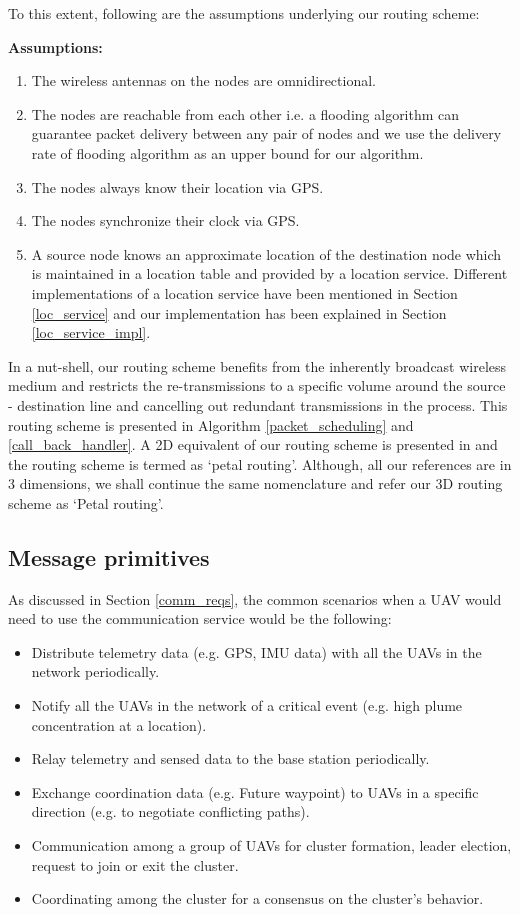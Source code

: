 To this extent, following are the assumptions underlying our routing scheme:

\textbf{Assumptions:}
\begin{enumerate}
\item The wireless antennas on the nodes are omnidirectional.
\item The nodes are reachable from each other i.e. a flooding algorithm can guarantee packet delivery between any pair of nodes and we use the delivery rate of flooding algorithm as an upper bound for our algorithm.
\item The nodes always know their location via GPS. 
\item The nodes synchronize their clock via GPS.
\item A source node knows an approximate location of the destination node which is maintained in a location table and provided by a location service. Different implementations of a location service have been mentioned in Section \ref{loc_service} and our implementation has been explained in Section \ref{loc_service_impl}. 
\end{enumerate}

In a nut-shell, our routing scheme benefits from the inherently broadcast wireless medium and restricts the re-transmissions to a specific volume around the source - destination line and cancelling out redundant transmissions in the process. This routing scheme is presented in Algorithm \ref{packet_scheduling} and \ref{call_back_handler}. A 2D equivalent of our routing scheme is presented in \cite{6133499} and the routing scheme is termed as `petal routing'. Although, all our references are in 3 dimensions, we shall continue the same nomenclature and refer our 3D routing scheme as `Petal routing'.


\subsection{Message primitives} \label{message_primitives}

As discussed in Section \ref{comm_reqs}, the common scenarios when a UAV would need to use the communication service would be the following:

\begin{itemize}
    \item Distribute telemetry data (e.g. GPS, IMU data) with all the UAVs in the network periodically.
    \item Notify all the UAVs in the network of a critical event (e.g. high plume concentration at a location).
    \item Relay telemetry and sensed data to the base station periodically.
    \item Exchange coordination data (e.g. Future waypoint) to UAVs in a specific direction (e.g. to negotiate conflicting paths).
    \item Communication among a group of UAVs for cluster formation, leader election, request to join or exit the cluster. 
    \item Coordinating among the cluster for a consensus on the cluster's behavior.
\end{itemize}

